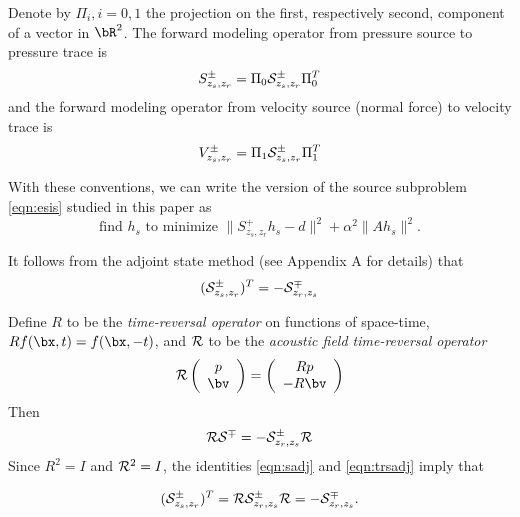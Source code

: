 Denote by $\Pi_i, i=0,1$ the projection on the first,
respectively second, component of a vector in $\bR^2$. The 
forward modeling operator from pressure source to pressure trace is
\begin{equation}
  \label{eqn:sdef}
  S^{\pm}_{z_s,z_r} = \Pi_0 {\cal S}^{\pm}_{z_s,z_r} \Pi_0^T 
\end{equation}
and the forward modeling operator from velocity source (normal force)
to velocity trace is
\begin{equation}
  \label{eqn:vdef}
  V^{\pm}_{z_s,z_r} = \Pi_1 {\cal S}^{\pm}_{z_s,z_r} \Pi_1^T 
\end{equation}

With these conventions, we can write the version of the source
subproblem \ref{eqn:esis} studied in this paper as
\begin{equation}
  \label{eqn:esisp}
  \mbox{find }h_s\mbox{ to minimize }\|S^{+}_{z_s,z_r}h_s- d\|^2 +
  \alpha^2\|Ah_s\|^2.
\end{equation}


It follows from the adjoint state method (see Appendix A for details) that
\begin{equation}
  \label{eqn:sadj1}
  ({\cal S}^{\pm}_{z_s, z_r})^T = -{\cal S}^{\mp}_{z_r,z_s}
\end{equation}

Define $R$ to be the {\em time-reversal operator} on functions of
space-time, $Rf(\bx,t) = f(\bx,-t)$, and ${\cal R}$ to be the {\em
  acoustic field time-reversal operator}
\begin{equation}
  \label{eqn:trdef}
  {\cal R} \left(
    \begin{array}{c}
      p\\
      \bv
    \end{array}
  \right) =
  \left(
    \begin{array}{c}
      Rp\\
      -R\bv
    \end{array}
  \right)
\end{equation}
Then 
\begin{equation}
  \label{eqn:trsadj}
  {\cal R}{\cal S}^{\mp} = -{\cal S}^{\pm}_{z_r,z_s}{\cal R}
\end{equation}
Since $R^2 = I$ and ${\cal R}^2 = I$, the identities \ref{eqn:sadj} and \ref{eqn:trsadj} imply that

\begin{equation} 
  \label{eqn:trtr}
 ({\cal S}^{\pm}_{z_s,z_r})^T = {\cal R}{\cal S}_{z_r,z_s}^{\pm}{\cal R}=
 -{\cal S}^{\mp}_{z_r,z_s}.
\end{equation}

